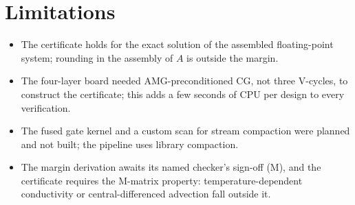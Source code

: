 \section{Limitations}
\begin{itemize}
\item The certificate holds for the exact solution of the assembled floating-point system;
rounding in the assembly of $A$ is outside the margin.
\item The four-layer board needed AMG-preconditioned CG, not three V-cycles, to construct the
certificate; this adds a few seconds of CPU per design to every verification.
\item The fused gate kernel and a custom scan for stream compaction were planned and not built;
the pipeline uses library compaction.
\item The margin derivation awaits its named checker's sign-off (M), and the certificate
requires the M-matrix property: temperature-dependent conductivity or central-differenced
advection fall outside it.
\end{itemize}
